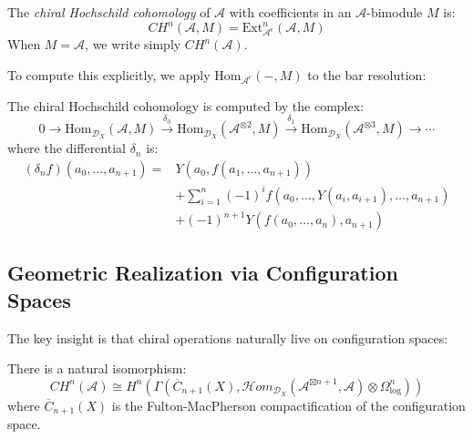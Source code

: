 \begin{definition}
The \emph{chiral Hochschild cohomology} of $\mathcal{A}$ with coefficients in an $\mathcal{A}$-bimodule $M$ is:
\[
CH^n(\mathcal{A}, M) = \text{Ext}^n_{\mathcal{A}^e}(\mathcal{A}, M)
\]
When $M = \mathcal{A}$, we write simply $CH^n(\mathcal{A})$.
\end{definition}

To compute this explicitly, we apply $\text{Hom}_{\mathcal{A}^e}(-, M)$ to the bar resolution:

\begin{theorem}
The chiral Hochschild cohomology is computed by the complex:
\[
0 \to \text{Hom}_{\mathcal{D}_X}(\mathcal{A}, M) \xrightarrow{\delta_0} \text{Hom}_{\mathcal{D}_X}(\mathcal{A}^{\otimes 2}, M) \xrightarrow{\delta_1} \text{Hom}_{\mathcal{D}_X}(\mathcal{A}^{\otimes 3}, M) \to \cdots
\]
where the differential $\delta_n$ is:
\begin{align}
(\delta_n f)(a_0, \ldots, a_{n+1}) = &Y(a_0, f(a_1, \ldots, a_{n+1})) \\
&+ \sum_{i=1}^n (-1)^i f(a_0, \ldots, Y(a_i, a_{i+1}), \ldots, a_{n+1}) \\
&+ (-1)^{n+1} Y(f(a_0, \ldots, a_n), a_{n+1})
\end{align}
\end{theorem}

\subsection{Geometric Realization via Configuration Spaces}

The key insight is that chiral operations naturally live on configuration spaces:

\begin{theorem}
\label{thm:geometric-chiral-hochschild}
There is a natural isomorphism:
\[
CH^n(\mathcal{A}) \cong H^n\left(\Gamma\left(\overline{C}_{n+1}(X), \mathcal{H}om_{\mathcal{D}_X}(\mathcal{A}^{\boxtimes n+1}, \mathcal{A}) \otimes \Omega^n_{\log}\right)\right)
\]
where $\overline{C}_{n+1}(X)$ is the Fulton-MacPherson compactification of the configuration space.
\end{theorem}

